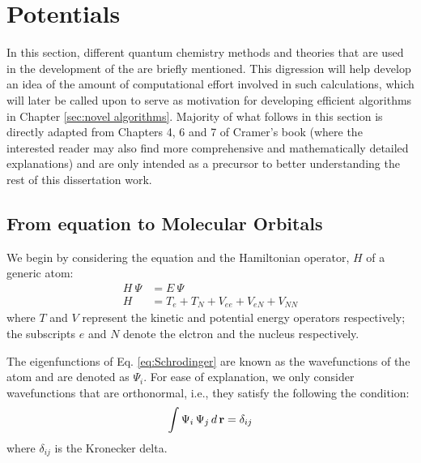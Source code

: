     \section{\Abinitio{} Potentials}
        In this section, different quantum chemistry methods and theories that are used in the development of the \abinitio{} \PESs{} are briefly mentioned. This digression will help develop an idea of the amount of computational effort involved in such calculations, which will later be called upon to serve as motivation for developing efficient algorithms in Chapter \ref{sec:novel algorithms}. Majority of what follows in this section is directly adapted from Chapters 4, 6 and 7 of Cramer's book \cite{Cramer} (where the interested reader may also find more comprehensive and mathematically detailed explanations) and are only intended as a precursor to better understanding the rest of this dissertation work. \\
        \subsection{From \Schrodinger{} equation to Molecular Orbitals}
            We begin by considering the \Schrodinger{} equation and the Hamiltonian operator, $H$ of a generic atom:
            \begin{equation}\label{eq:Schrodinger}
                \begin{aligned}
                    H~\Psi &= E~\Psi \\
                    H &= T_e + T_N + V_{ee} + V_{eN} + V_{NN}
                \end{aligned}
            \end{equation}
            where $T$ and $V$ represent the kinetic and potential energy operators respectively; the subscripts $e$ and $N$ denote the elctron and the nucleus respectively.

            The eigenfunctions of Eq. \eqref{eq:Schrodinger} are known as the wavefunctions of the atom and are denoted as $\Psi_i$. For ease of explanation, we only consider wavefunctions that are orthonormal, i.e., they satisfy the following the condition:
            \begin{equation}\label{eq:orthonormality}
                \int \Psi_i\, \Psi_j\, d\, {\mathbf {r}} = \delta_{ij}
            \end{equation}
            where $\delta_{ij}$ is the Kronecker delta.

